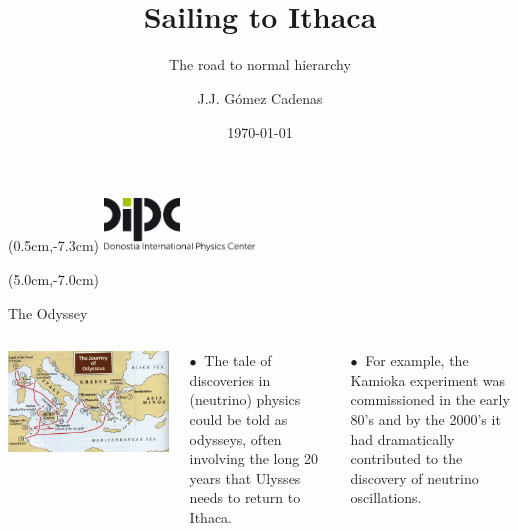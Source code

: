 \documentclass [aspectratio=169]{beamer}
\title[]{\vspace{60pt} \\
Sailing to Ithaca} %
\subtitle{The road to normal hierarchy}
\author[]{J.J. Gómez Cadenas}
\institute[]{Donostia International Physics Center}
\date{\today}
\begin{document}
{
\begin{frame}
    \titlepage
    \begin{textblock*}{4cm}(0.5cm,-7.3cm)
        \includegraphics[width=4cm]{dipc.png}
    \end{textblock*}
    \begin{textblock*}{8cm}(5.0cm,-7.0cm)
        \huge {} %
    \end{textblock*}
\end{frame}
}

\begin{frame}{The Odyssey}
\begin{columns}
\includegraphics[scale=0.26]{odyssey.png}

$\bullet~$ The tale of discoveries in (neutrino) physics could be told as odysseys, often involving the long 20 years that Ulysses needs to return to Ithaca. 

$\bullet~$ For example, the Kamioka experiment was commissioned in the early 80’s and by the 2000’s it had dramatically contributed to the discovery of neutrino oscillations. 

\end{columns}
\end{frame}
\end{document}
